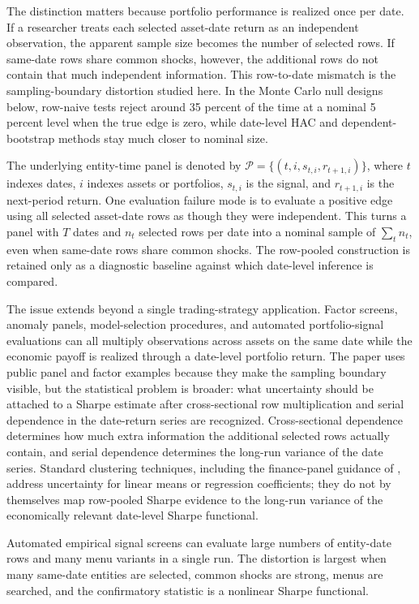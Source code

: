 \documentclass[12pt,a4paper]{article}
\begin{document}
The distinction matters because portfolio performance is realized once
per date.  If a researcher treats each selected asset-date return as an
independent observation, the apparent sample size becomes the number of
selected rows.  If same-date rows share common shocks, however, the
additional rows do not contain that much independent information.  This
row-to-date mismatch is the sampling-boundary distortion studied here.
In the Monte Carlo null designs below, row-naive tests reject around 35
percent of the time at a nominal 5 percent level when the true edge is
zero, while date-level HAC and dependent-bootstrap methods stay much
closer to nominal size.

The underlying entity-time panel is denoted by
\(\mathcal P=\{(t,i,s_{t,i},r_{t+1,i})\}\), where \(t\) indexes dates,
\(i\) indexes assets or portfolios, \(s_{t,i}\) is the signal, and
\(r_{t+1,i}\) is the next-period return.  One evaluation failure mode is
to evaluate a positive edge using all selected asset-date rows as though
they were independent.  This turns a panel with \(T\) dates and \(n_t\)
selected rows per date into a nominal sample of \(\sum_t n_t\), even
when same-date rows share common shocks.  The row-pooled construction is
retained only as a diagnostic baseline against which date-level
inference is compared.

The issue extends beyond a single trading-strategy application.  Factor
screens, anomaly panels, model-selection procedures, and automated
portfolio-signal evaluations can all multiply observations across
assets on the same date while the economic payoff is realized through a
date-level portfolio return.  The paper uses public panel and factor
examples because they make the sampling boundary visible, but the
statistical problem is broader: what uncertainty should be attached to a
Sharpe estimate after cross-sectional row multiplication and serial
dependence in the date-return series are recognized.  Cross-sectional
dependence determines how much extra information the additional selected
rows actually contain, and serial dependence determines the long-run
variance of the date series.
Standard clustering techniques, including the finance-panel guidance of
\citet{petersen2009estimating}, address uncertainty for linear means or
regression coefficients; they do not by themselves map
row-pooled Sharpe evidence to the long-run variance of the economically
relevant date-level Sharpe functional.

Automated empirical signal screens can evaluate large numbers of
entity-date rows and many menu variants in a single run.  The distortion
is largest when many same-date entities are selected, common shocks are
strong, menus are searched, and the confirmatory statistic is a nonlinear
Sharpe functional.
\end{document}
